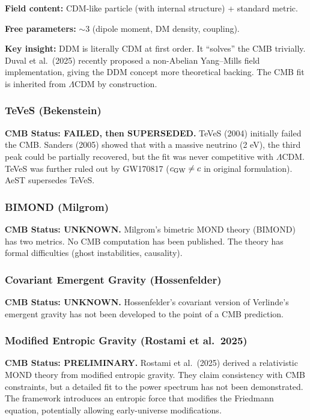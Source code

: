 \documentclass[11pt,a4paper]{article}
\begin{document}
\textbf{Field content:} CDM-like particle (with internal structure) + standard metric.

\textbf{Free parameters:} $\sim$3 (dipole moment, DM density, coupling).

\textbf{Key insight:} DDM is literally CDM at first order. It ``solves'' the CMB trivially. Duval et al.\ (2025) recently proposed a non-Abelian Yang--Mills field implementation, giving the DDM concept more theoretical backing. The CMB fit is inherited from $\Lambda$CDM by construction.

\subsubsection{TeVeS (Bekenstein)}

\textbf{CMB Status: FAILED, then SUPERSEDED.} TeVeS (2004) initially failed the CMB. Sanders (2005) showed that with a massive neutrino (2 eV), the third peak could be partially recovered, but the fit was never competitive with $\Lambda$CDM. TeVeS was further ruled out by GW170817 ($c_{\rm GW} \neq c$ in original formulation). AeST supersedes TeVeS.

\subsubsection{BIMOND (Milgrom)}

\textbf{CMB Status: UNKNOWN.} Milgrom's bimetric MOND theory (BIMOND) has two metrics. No CMB computation has been published. The theory has formal difficulties (ghost instabilities, causality).

\subsubsection{Covariant Emergent Gravity (Hossenfelder)}

\textbf{CMB Status: UNKNOWN.} Hossenfelder's covariant version of Verlinde's emergent gravity has not been developed to the point of a CMB prediction.

\subsubsection{Modified Entropic Gravity (Rostami et al.\ 2025)}

\textbf{CMB Status: PRELIMINARY.} Rostami et al.\ (2025) derived a relativistic MOND theory from modified entropic gravity. They claim consistency with CMB constraints, but a detailed fit to the power spectrum has not been demonstrated. The framework introduces an entropic force that modifies the Friedmann equation, potentially allowing early-universe modifications.
\end{document}
